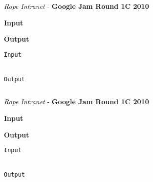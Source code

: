 \begin{solution}
	
	\begin{lstlisting}[language=c++, caption="Store credit c++ solution"]


	\end{lstlisting}
\end{solution}



\begin{problem}{\textit{Rope Intranet} - \textbf{Google Jam Round 1C 2010}}




\textbf{Input}


\textbf{Output}


\begin{framed}
	\begin{verbatim}
Input 


Output 

	\end{verbatim}
\end{framed}

\end{problem}

\begin{solution}
	
	\begin{lstlisting}[language=c++, caption="Store credit c++ solution"]


	\end{lstlisting}
\end{solution}



\begin{problem}{\textit{Rope Intranet} - \textbf{Google Jam Round 1C 2010}}




\textbf{Input}


\textbf{Output}


\begin{framed}
	\begin{verbatim}
Input 


Output 

	\end{verbatim}
\end{framed}

\end{problem}

\begin{solution}
	
	\begin{lstlisting}[language=c++, caption="Store credit c++ solution"]


	\end{lstlisting}
\end{solution}



